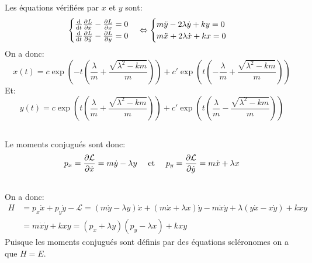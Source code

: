 \documentclass[10pt,a4paper]{article}
\begin{document}
\section{}
\subsection{}
Les équations vérifiées par $x$ et $y$ sont:
\[
\begin{cases}
\dv{}{t}\pdv{L}{\dot{x}} - \pdv{L}{x} = 0\\
\dv{}{t}\pdv{L}{\dot{y}} - \pdv{L}{y} = 0
\end{cases}
\Leftrightarrow
\begin{cases}
m\ddot{y} - 2\lambda \dot{y} + ky = 0\\
m\ddot{x} + 2\lambda \dot{x} + kx = 0
\end{cases}
\]
On a donc:
\[
x(t) = c \exp(-t\left(\frac{\lambda}{m} + \frac{\sqrt{\lambda^2 - km}}{m}\right)) + c' \exp(t\left( -\frac{\lambda}{m} + \frac{\sqrt{\lambda^2 - km}}{m} \right))
\]
Et:
\[
y(t) = c \exp(t\left(\frac{\lambda}{m} + \frac{\sqrt{\lambda^2 - km}}{m}\right)) + c' \exp(t\left(\frac{\lambda}{m} - \frac{\sqrt{\lambda^2 - km}}{m} \right))
\]

\subsection{}
Le moments conjugués sont donc:
\[
p_x = \pdv{\mathcal{L}}{\dot{x}} = m\dot{y} - \lambda y \quad \text{ et } \quad p_y = \pdv{\mathcal{L}}{\dot{y}} = m\dot{x} + \lambda x
\]

\subsection{}
On a donc:
\begin{align*}
H &= p_x \dot{x} + p_y \dot{y} - \mathcal{L} = (m\dot{y} - \lambda y) \dot{x} + (m\dot{x} + \lambda x) \dot{y} - m \dot{x} \dot{y} + \lambda(y\dot{x} - x\dot{y}) + kxy\\
&= m\dot{x}\dot{y} + kxy = (p_x + \lambda y)(p_y - \lambda x) + k x y
\end{align*}
Puisque les moments conjugués sont définis par des équations scléronomes on a que $H = E$.


\section{}
\end{document}
